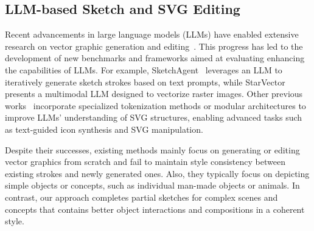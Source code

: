 \subsection{LLM-based Sketch and SVG Editing}
Recent advancements in large language models (LLMs) have enabled extensive research on vector graphic generation and editing~\cite{nishina2024svgeditbench,zou2024vgbench,cai2023leveraging}.
This progress has led to the development of new benchmarks and frameworks aimed at evaluating enhancing the capabilities of LLMs.
For example, SketchAgent~\cite{vinker2024sketchagent} leverages an LLM to iteratively generate sketch strokes based on text prompts, while StarVector~\cite{rodriguez2023starvector} presents a multimodal LLM designed to vectorize raster images.
Other previous works~\cite{wu2023iconshop,tang2024strokenuwa,xing2024empowering} incorporate specialized tokenization methods or modular architectures to improve LLMs’ understanding of SVG structures, enabling advanced tasks such as text-guided icon synthesis and SVG manipulation. 

Despite their successes, existing methods mainly focus on generating or editing vector graphics from scratch and fail to maintain style consistency between existing strokes and newly generated ones. 
Also, they typically focus on depicting simple objects or concepts, such as individual man-made objects or animals. 
In contrast, our approach completes partial sketches for complex scenes and concepts that contains better object interactions and compositions in a coherent style.

